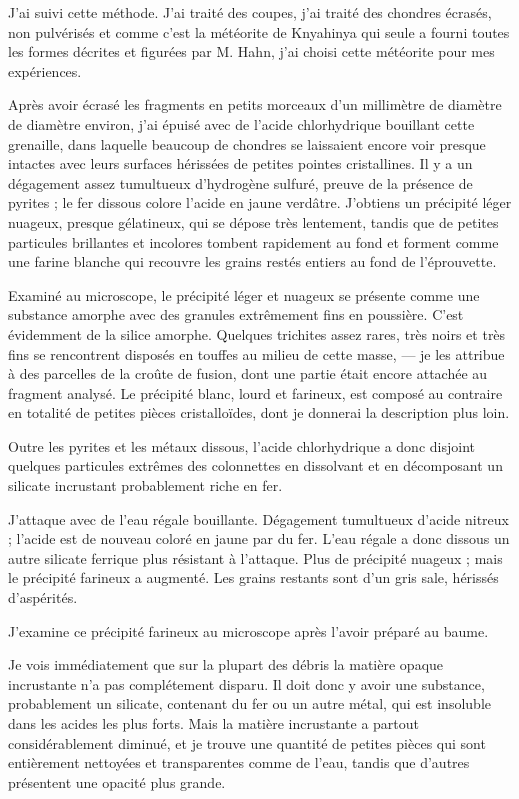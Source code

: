 \documentclass[a4paper, 12pt, oneside, french]{article}
\begin{document}
J'ai suivi cette méthode. J'ai traité des coupes, j'ai traité des chondres écrasés, non pulvérisés et comme c'est la météorite de Knyahinya qui seule a fourni toutes les formes décrites et figurées par M. Hahn, j'ai choisi cette météorite pour mes expériences.

Après avoir écrasé les fragments en petits morceaux d'un millimètre de diamètre de diamètre environ, j'ai épuisé avec de l'acide chlorhydrique bouillant cette grenaille, dans laquelle beaucoup de chondres se laissaient encore voir presque intactes avec leurs surfaces hérissées de petites pointes cristallines. Il y a un dégagement assez tumultueux d'hydrogène sulfuré, preuve de la présence de pyrites ; le fer dissous colore l'acide en jaune verdâtre. J'obtiens un précipité léger nuageux, presque gélatineux, qui se dépose très lentement, tandis que de petites particules brillantes et incolores tombent rapidement au fond et forment comme une farine blanche qui recouvre les grains restés entiers au fond de l'éprouvette.

Examiné au microscope, le précipité léger et nuageux se présente comme une substance amorphe avec des granules extrêmement fins en poussière. C'est évidemment de la silice amorphe. Quelques trichites assez rares, très noirs et très fins se rencontrent disposés en touffes au milieu de cette masse, --- je les attribue à des parcelles de la croûte de fusion, dont une partie était encore attachée au fragment analysé. Le précipité blanc, lourd et farineux, est composé au contraire en totalité de petites pièces cristalloïdes, dont je donnerai la description plus loin.

Outre les pyrites et les métaux dissous, l'acide chlorhydrique a donc disjoint quelques particules extrêmes des colonnettes en dissolvant et en décomposant un silicate incrustant probablement riche en fer.

J'attaque avec de l'eau régale bouillante. Dégagement tumultueux d'acide nitreux ; l'acide est de nouveau coloré en jaune par du fer. L'eau régale a donc dissous un autre silicate ferrique plus résistant à l'attaque. Plus de précipité nuageux ; mais le précipité farineux a augmenté. Les grains restants sont d'un gris sale, hérissés d'aspérités.

J'examine ce précipité farineux au microscope après l'avoir préparé au baume.

Je vois immédiatement que sur la plupart des débris la matière opaque incrustante n'a pas complétement disparu. Il doit donc y avoir une substance, probablement un silicate, contenant du fer ou un autre métal, qui est insoluble dans les acides les plus forts. Mais la matière incrustante a partout considérablement diminué, et je trouve une quantité de petites pièces qui sont entièrement nettoyées et transparentes comme de l'eau, tandis que d'autres présentent une opacité plus grande.
\end{document}
